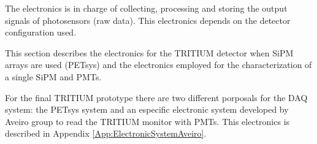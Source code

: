The electronics is in charge of collecting, processing and storing the output signals of photosensors (raw data). This electronics depends on the detector configuration used.

This section describes the electronics for the TRITIUM detector when SiPM arrays are used (PETsys) and the electronics employed for the characterization of a single SiPM and PMTs.

For the final TRITIUM prototype there are two different porposals for the DAQ system: the PETsys system and an especific electronic system developed by Aveiro group to read the TRITIUM monitor with PMTs. This electronics is described in Appendix \ref{App:ElectronicSystemAveiro}.


 